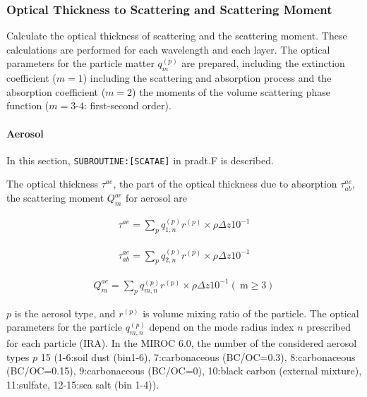 \hypertarget{optical-thickness-to-scattering-and-scattering-moment}{%
\subsubsection{Optical Thickness to Scattering and Scattering
Moment}\label{optical-thickness-to-scattering-and-scattering-moment}}

Calculate the optical thickness of scattering and the scattering moment.
These calculations are performed for each wavelength and each layer. The
optical parameters for the particle matter \(q_{m}^{(p)}\) are prepared,
including the extinction coefficient (\(m = 1\)) including the
scattering and absorption process and the absorption coefficient
(\(m = 2\)) the moments of the volume scattering phase function
(\(m=3\text{-}4\): first-second order).

\hypertarget{aerosol}{%
\paragraph{Aerosol}\label{aerosol}}

In this section, \texttt{SUBROUTINE:{[}SCATAE{]}} in pradt.F is
described.

The optical thickness \(\tau^{a e}\), the part of the optical thickness
due to absorption \(\tau_{ab}^{a e}\), the scattering moment
\(Q_{m}^{a e}\) for aerosol are

\begin{eqnarray}
\tau^{a e}=\sum_{p} q_{1, n}^{(p)} r^{(p)} \times \rho \Delta z 10^{-1}
\end{eqnarray}

\begin{eqnarray}
\tau_{ab}^{a e}=\sum_{p} q_{2, n}^{(p)} r^{(p)} \times \rho \Delta z 10^{-1}
\end{eqnarray}

\begin{eqnarray}
Q_{m}^{a e}=\sum_{p} q_{m, n}^{(p)} r^{(p)} \times \rho \Delta z 10^{-1} (\mathrm{~m} \geq 3)
\end{eqnarray}

\(p\) is the aerosol type, and \(r^{(p)}\) is volume mixing ratio of the
particle. The optical parameters for the particle \(q_{m, n}^{(p)}\)
depend on the mode radius index \(n\) prescribed for each particle
(IRA). In the MIROC 6.0, the number of the considered aerosol types
\(p\) 15 (1-6:soil dust (bin1-6), 7:carbonaceous (BC/OC=0.3),
8:carbonaceous (BC/OC=0.15), 9:carbonaceous (BC/OC=0), 10:black carbon
(external mixture), 11:sulfate, 12-15:sea salt (bin 1-4)).

